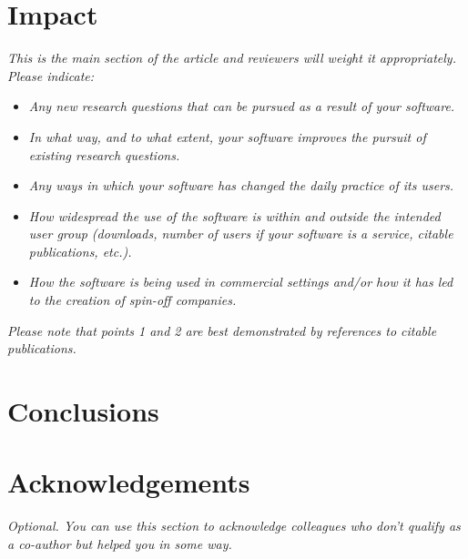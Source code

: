 \documentclass[preprint,12pt, a4paper]{elsarticle}
\begin{document}
\section{Impact}
\textit{This is the main section of the article and reviewers will weight it appropriately.
Please indicate:}
\begin{itemize}
    \item \textit{Any new research questions that can be pursued as a result of your software.}
    \item \textit{In what way, and to what extent, your software improves the pursuit of existing research questions.}
    \item \textit{Any ways in which your software has changed the daily practice of its users.}
    \item \textit{How widespread the use of the software is within and outside the intended user group (downloads, number of users if your software is a service, citable publications, etc.).}
    \item \textit{How the software is being used in commercial settings and/or how it has led to the creation of spin-off companies.}
    \end{itemize}
\textit{Please note that points 1 and 2 are best demonstrated by
  references to citable publications.}

\section{Conclusions}

\section*{Acknowledgements}
\label{}
\textit{Optional. You can use this section to acknowledge colleagues who don’t qualify as a co-author but helped you in some way. }





\end{document}

